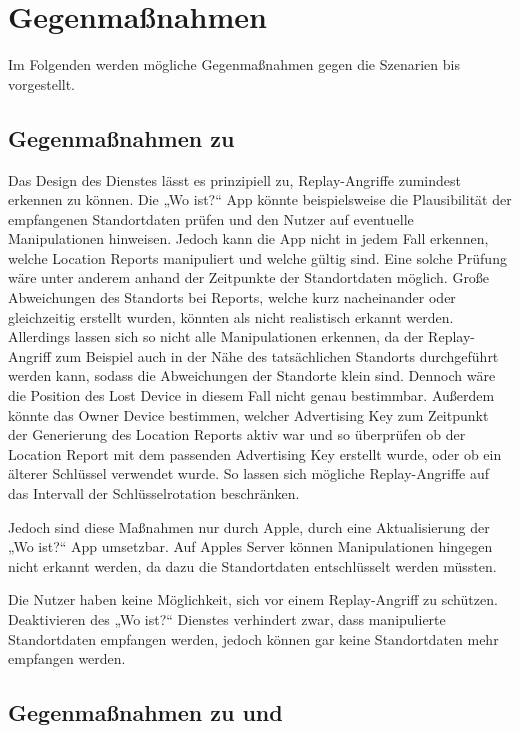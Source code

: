 \section{Gegenmaßnahmen}
\label{sec:Gegenmassnahmen}

Im Folgenden werden mögliche Gegenmaßnahmen gegen die Szenarien  bis  vorgestellt.


\subsection{Gegenmaßnahmen zu }
Das Design des Dienstes lässt es prinzipiell zu, Replay-Angriffe zumindest erkennen zu können.
Die „Wo ist?“ App könnte beispielsweise die Plausibilität der empfangenen Standortdaten prüfen und den Nutzer auf eventuelle Manipulationen hinweisen.
Jedoch kann die App nicht in jedem Fall erkennen, welche Location Reports manipuliert und welche gültig sind.
Eine solche Prüfung wäre unter anderem anhand der Zeitpunkte der Standortdaten möglich.
Große Abweichungen des Standorts bei Reports, welche kurz nacheinander oder gleichzeitig erstellt wurden, könnten als nicht realistisch erkannt werden.
Allerdings lassen sich so nicht alle Manipulationen erkennen, da der Replay-Angriff zum Beispiel auch in der Nähe des tatsächlichen Standorts durchgeführt werden kann, sodass die Abweichungen der Standorte klein sind.
Dennoch wäre die Position des Lost Device in diesem Fall nicht genau bestimmbar.
Außerdem könnte das Owner Device bestimmen, welcher Advertising Key zum Zeitpunkt der Generierung des Location Reports aktiv war und so überprüfen ob der Location Report mit dem passenden Advertising Key erstellt wurde, oder ob ein älterer Schlüssel verwendet wurde.
So lassen sich mögliche Replay-Angriffe auf das Intervall der Schlüsselrotation beschränken.

Jedoch sind diese Maßnahmen nur durch Apple, durch eine Aktualisierung der „Wo ist?“ App umsetzbar. 
Auf Apples Server können Manipulationen hingegen nicht erkannt werden, da dazu die Standortdaten entschlüsselt werden müssten.

Die Nutzer haben keine Möglichkeit, sich vor einem Replay-Angriff zu schützen.
Deaktivieren des „Wo ist?“ Dienstes verhindert zwar, dass manipulierte Standortdaten empfangen werden, jedoch können gar keine Standortdaten mehr empfangen werden.

\subsection{Gegenmaßnahmen zu  und }

